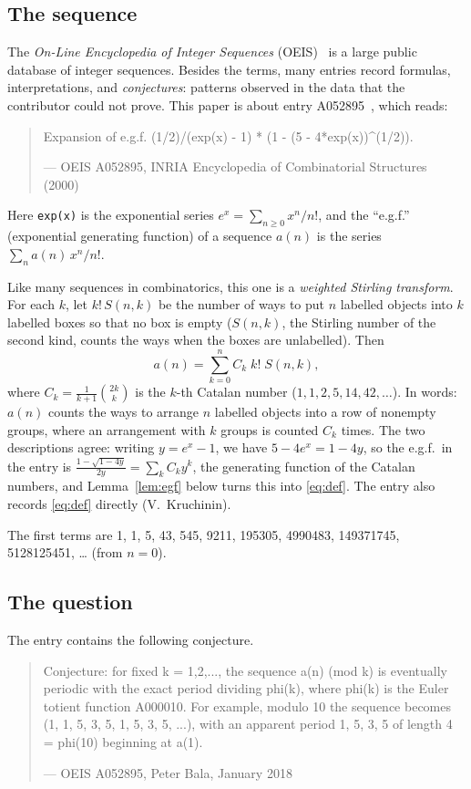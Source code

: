 \documentclass[11pt,a4paper]{article}
\theoremstyle{definition}
\theoremstyle{remark}
\begin{document}
\subsection{The sequence}\label{sec:sequence}
The \emph{On-Line Encyclopedia of Integer Sequences} (OEIS)~\cite{oeisdb} is a large public database of integer sequences.
Besides the terms, many entries record formulas, interpretations, and \emph{conjectures}: patterns observed in the data
that the contributor could not prove. This paper is about entry A052895~\cite{oeis}, which reads:
\begin{quote}\small\ttfamily\raggedright Expansion of e.g.f. (1/2)/(exp(x) - 1) * (1 - (5 - 4*exp(x))\^{}(1/2)).\par\smallskip\hfill\textrm{--- OEIS A052895, INRIA Encyclopedia of Combinatorial Structures (2000)}\end{quote}

Here \texttt{exp(x)} is the exponential series $e^x=\sum_{n\ge0}x^n/n!$, and the ``e.g.f.'' (exponential
generating function) of a sequence $a(n)$ is the series $\sum_na(n)\,x^n/n!$.

Like many sequences in combinatorics, this one is a \emph{weighted Stirling transform}. For each $k$, let
$k!\,S(n,k)$ be the number of ways to put $n$ labelled objects into $k$ labelled boxes so that no box is empty
($S(n,k)$, the Stirling number of the second kind, counts the ways when the boxes are unlabelled). Then
\begin{equation}\label{eq:def}
a(n)=\sum_{k=0}^{n}C_k\;k!\;S(n,k),
\end{equation}
where $C_k=\frac1{k+1}\binom{2k}{k}$ is the $k$-th Catalan number ($1,1,2,5,14,42,\dots$). In words: $a(n)$ counts the ways to arrange $n$ labelled objects into a row of
nonempty groups, where an arrangement with $k$ groups is counted $C_k$ times. The two descriptions agree: writing $y=e^x-1$, we have $5-4e^x=1-4y$, so the e.g.f.\ in the entry is
$\frac{1-\sqrt{1-4y}}{2y}=\sum_kC_ky^k$, the generating function of the Catalan numbers, and Lemma~\ref{lem:egf} below
turns this into \eqref{eq:def}. The entry also records \eqref{eq:def} directly (V.~Kruchinin).

The first terms are 1, 1, 5, 43, 545, 9211, 195305, 4990483, 149371745, 5128125451, \dots{} (from $n=0$).

\subsection{The question}
The entry contains the following conjecture.
\begin{quote}\small\ttfamily\raggedright Conjecture: for fixed k = 1,2,..., the sequence a(n) (mod k) is eventually periodic with the exact period dividing phi(k), where phi(k) is the Euler totient function A000010. For example, modulo 10 the sequence becomes (1, 1, 5, 3, 5, 1, 5, 3, 5, ...), with an apparent period 1, 5, 3, 5 of length 4 = phi(10) beginning at a(1).\par\smallskip\hfill\textrm{--- OEIS A052895, Peter Bala, January 2018}\end{quote}
\end{document}
